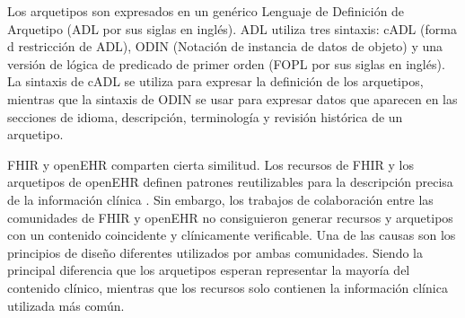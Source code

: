 Los arquetipos son expresados en un genérico Lenguaje de Definición de Arquetipo \cite{openEHRADL} (ADL por sus siglas en inglés). ADL utiliza tres sintaxis: cADL (forma d restricción de ADL), ODIN (Notación de instancia de datos de objeto) y una versión de lógica de predicado de primer orden (FOPL por sus siglas en inglés). La sintaxis de cADL se utiliza para expresar la definición de los arquetipos, mientras que la sintaxis de ODIN se usar para expresar datos que aparecen en las secciones de idioma, descripción, terminología y revisión histórica de un arquetipo.

FHIR y openEHR comparten cierta similitud. Los recursos de FHIR y los arquetipos de openEHR definen patrones reutilizables para la descripción precisa de la información clínica \cite{Bosca15}. Sin embargo, los trabajos de colaboración entre las comunidades de FHIR y openEHR \cite{Collaboration} no consiguieron generar recursos y arquetipos con un contenido coincidente y clínicamente verificable. Una de las causas son los principios de diseño diferentes utilizados por ambas comunidades. Siendo la principal diferencia que los arquetipos esperan representar la mayoría del contenido clínico, mientras que los recursos solo contienen la información clínica utilizada más común.
